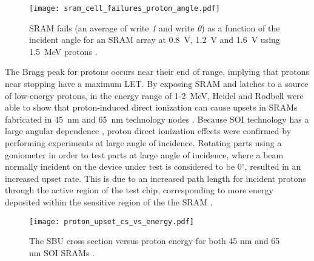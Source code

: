 \begin{figure}[htbp]
    \begin{center}
        \texttt{[image: sram\_cell\_failures\_proton\_angle.pdf]}
    \end{center}
    \caption[SRAM fails (an average of write \emph{1} and write \emph{0}) as a function of the incident angle for an SRAM array at 0.8~V, 1.2~V and 1.6~V using 1.5~MeV protons.]{SRAM fails (an average of write \emph{1} and write \emph{0}) as a function of the incident angle for an SRAM array at 0.8~V, 1.2~V and 1.6~V using 1.5~MeV protons \cite{Rodbell:2007vl}.}
    \label{fig:sram_proton_angle_dep}
\end{figure}

The Bragg peak for protons occurs near their end of range, implying that protons near stopping have a maximum LET.
By exposing SRAM and latches to a source of low-energy protons, in the energy range of 1-2~MeV, Heidel and Rodbell were able to show that proton-induced direct ionization can cause upsets in SRAMs fabricated in 45~nm and 65~nm technology nodes \cite{Heidel:2006tp,Rodbell:2007vl,Heidel:2009vx}.
Because SOI technology has a large angular dependence \cite{Reed:2002wn}, proton direct ionization effects were confirmed by performing experiments at large angle of incidence.
Rotating parts using a goniometer in order to test parts at large angle of incidence, where a beam normally incident on the device under test is considered to be 0$^\circ$, resulted in an increased upset rate.
This is due to an increased path length for incident protons through the active region of the test chip, corresponding to more energy deposited within the sensitive region of the the SRAM \cite{Heidel:2006tp}.

\begin{figure}[htbp]
    \begin{center}
        \texttt{[image: proton\_upset\_cs\_vs\_energy.pdf]}
    \end{center}
    \caption[The SBU cross section versus proton energy for both 45 nm and 65 nm SOI SRAMs.]{The SBU cross section versus proton energy for both 45 nm and 65 nm SOI SRAMs \cite{Heidel:2009vx}.}
    \label{fig:seu_cs_vs_p_energy}
\end{figure}

